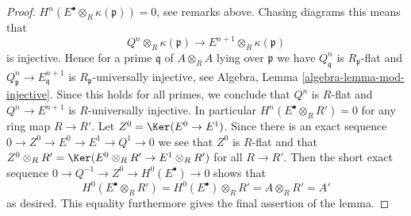 \begin{proof}
$H^n(E^\bullet \otimes_R \kappa(\mathfrak p)) = 0$, see remarks above.
Chasing diagrams this means that
$$
Q^n \otimes_R \kappa(\mathfrak p) \to E^{n + 1} \otimes_R \kappa(\mathfrak p)
$$
is injective. Hence for a prime $\mathfrak q$ of $A \otimes_R A$
lying over $\mathfrak p$ we have $Q^n_\mathfrak q$ is $R_\mathfrak p$-flat
and $Q^n_\mathfrak p \to E^{n + 1}_\mathfrak q$ is
$R_\mathfrak p$-universally injective, see
Algebra, Lemma \ref{algebra-lemma-mod-injective}.
Since this holds for all primes,
we conclude that $Q^n$ is $R$-flat
and $Q^n \to E^{n + 1}$ is $R$-universally injective. In particular
$H^n(E^\bullet \otimes_R R') = 0$ for any ring map $R \to R'$.
Let $Z^0 = \Ker(E^0 \to E^1)$. Since there is an exact sequence
$0 \to Z^0 \to E^0 \to E^1 \to Q^1 \to 0$ we see that $Z^0$
is $R$-flat and that
$Z^0 \otimes_R R' = \Ker(E^0 \otimes_R R' \to E^1 \otimes_R R')$
for all $R \to R'$. Then the short exact sequence
$0 \to Q^{-1} \to Z^0 \to H^0(E^\bullet) \to 0$
shows that
$$
H^0(E^\bullet \otimes_R R') = H^0(E^\bullet) \otimes_R R'
= A \otimes_R R' = A'
$$
as desired. This equality furthermore gives the final assertion
of the lemma.
\end{proof}